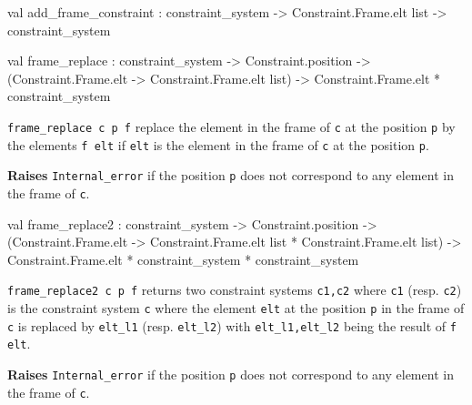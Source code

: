 \label{val:Constraint-underscoresystem.add-underscoreframe-underscoreconstraint}\begin{ocamldoccode}
val add_frame_constraint :
  constraint_system ->
  Constraint.Frame.elt list -> constraint_system
\end{ocamldoccode}




\label{val:Constraint-underscoresystem.frame-underscorereplace}\begin{ocamldoccode}
val frame_replace :
  constraint_system ->
  Constraint.position ->
  (Constraint.Frame.elt -> Constraint.Frame.elt list) ->
  Constraint.Frame.elt * constraint_system
\end{ocamldoccode}
\begin{ocamldocdescription}
{\tt{frame\_replace c p f}} replace the element in the frame of {\tt{c}} at the position {\tt{p}} by the elements {\tt{f elt}}
    if {\tt{elt}} is the element in the frame of {\tt{c}} at the position {\tt{p}}.

{\bf Raises} {\tt{Internal\_error}} if the position {\tt{p}} does not correspond to any element in the frame of {\tt{c}}.


\end{ocamldocdescription}




\label{val:Constraint-underscoresystem.frame-underscorereplace2}\begin{ocamldoccode}
val frame_replace2 :
  constraint_system ->
  Constraint.position ->
  (Constraint.Frame.elt ->
   Constraint.Frame.elt list * Constraint.Frame.elt list) ->
  Constraint.Frame.elt * constraint_system *
  constraint_system
\end{ocamldoccode}
\begin{ocamldocdescription}
{\tt{frame\_replace2 c p f}} returns two constraint systems {\tt{c1,c2}} where {\tt{c1}} (resp. {\tt{c2}}) is the constraint system {\tt{c}} where 
    the element {\tt{elt}} at the position {\tt{p}} in the frame of {\tt{c}} is replaced by {\tt{elt\_l1}} (resp. {\tt{elt\_l2}}) with {\tt{elt\_l1,elt\_l2}}
    being the result of {\tt{f elt}}.

{\bf Raises} {\tt{Internal\_error}} if the position {\tt{p}} does not correspond to any element in the frame of {\tt{c}}.


\end{ocamldocdescription}




